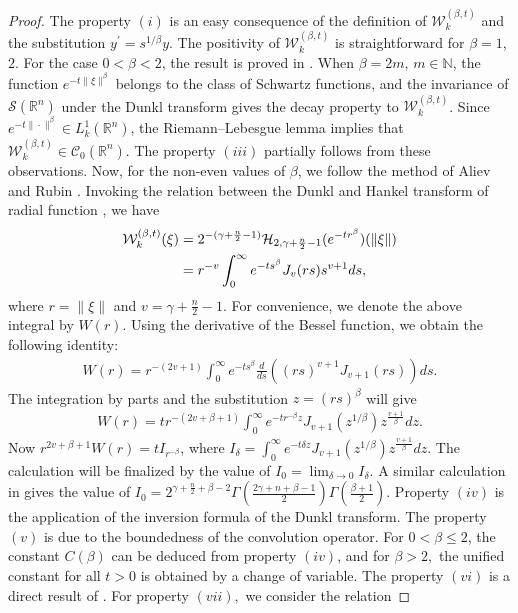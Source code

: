 \documentclass[11pt,a4paper,reqno]{amsproc}
\theoremstyle{definition}
\theoremstyle{remark}
\numberwithin{equation}{section}
\begin{document}
\begin{proof}
   The property $(i)$ is an easy consequence of the definition of $\mathcal{W}_k^{(\beta,t)}$ and the substitution  $y^\prime=s^{1/\beta}y$. 
  The positivity of $\mathcal{W}_k^{(\beta,t)}$ is straightforward for $\beta=1$, $2$. For the case $0<\beta<2$, the result is proved in \cite{Rejeb}. When $\beta=2m$, $m \in \mathbb{N}$, the function $e^{-t\|\xi\|^\beta}$ belongs to the class of Schwartz functions, and the invariance of $\mathcal{S}(\mathbb{R}^n)$ under the Dunkl transform gives the decay property to $\mathcal{W}_k^{(\beta, t)}$. Since $e^{-t\|\cdot\|^\beta} \in L_k^1(\mathbb{R}^n)$, the Riemann–Lebesgue lemma implies that $\mathcal{W}_k^{(\beta,t)} \in \mathcal{C}_0(\mathbb{R}^n)$. The property $(iii)$ partially follows from these observations. Now, for the non-even values of $\beta$, we follow the method of Aliev and Rubin \cite{Aliev-2008}. Invoking the relation between the Dunkl and Hankel transform of radial function \cite{Kobayashi, Rosler-2008}, we have 
    \begin{align}
        \mathcal{W}_k^{(\beta,t)}(\xi) &= 2^{-(\gamma+\frac{n}{2}-1)} \mathcal{H}_{2,\gamma+\frac{n}{2}-1} (e^{-tr^{\beta}})(\|\xi\|) \notag \\
        &=  {r}^{-v} \int_0^\infty e^{-ts^{\beta}} J_v(rs)s^{v+1}ds, \label{Dunkl-Hankel}
    \end{align} where $r=\|\xi\|$ and $v=\gamma+\frac{n}{2}-1$. For convenience, we denote the above integral by $W(r)$. Using the derivative of the Bessel function, we obtain the following identity: 
    \begin{align*}
        W(r)= r^{-(2v+1)}\int_0^\infty e^{-ts^{\beta}} \frac{d}{ds}\left( (rs)^{v+1} J_{v+1}(rs)\right)ds.
    \end{align*} The integration by parts and the substitution $z=(rs)^\beta$ will give
    \begin{align*}
        W(r)= t r^{-(2v+\beta+1)}\int_0^\infty e^{-tr^{-\beta} z}J_{v+1}(z^{1/\beta}) z^{\frac{v+1}{\beta}}dz.
        \end{align*} 
        Now $ r^{2v+\beta+1} W(r) = t I_{r^{-\beta}}$, where $I_\delta=\int_0^\infty e^{-t\delta z}J_{v+1}(z^{1/\beta}) z^{\frac{v+1}{\beta}}dz$. The calculation will be finalized by the value of $I_0=\lim_{\delta\rightarrow 0}I_\delta.$ A similar calculation in \cite{Aliev-2008} gives the value of $I_0= 2^{\gamma+\frac{n}{2}+\beta-2} \Gamma \left( \frac{2\gamma+n+\beta-1}{2} \right) \Gamma\left( \frac{\beta+1}{2} \right)$. Property $(iv)$ is the application of the inversion formula of the Dunkl transform. The property $(v)$ is due to the boundedness of the convolution operator. For $0<\beta \leq 2$, the constant $C(\beta)$ can be deduced from property $(iv)$, and for $\beta>2,$ the unified constant for all $t>0$ is obtained by a change of variable. The property $(vi)$ is a direct result of \cite[Theorem 6.2]{Thangavelu}. For property $(vii),$ we consider the relation

\end{proof}
\end{document}
